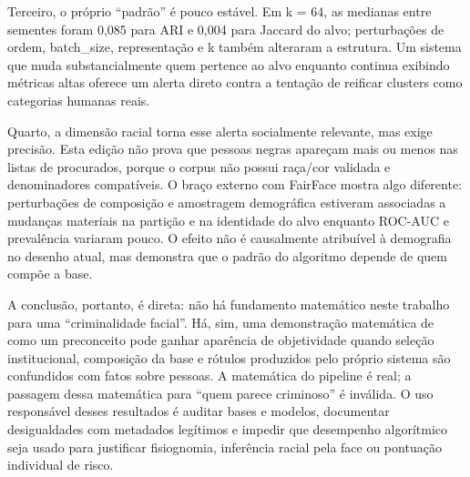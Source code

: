 Terceiro, o próprio ``padrão'' é pouco estável. Em k = 64, as medianas entre sementes foram 0,085 para ARI e 0,004 para Jaccard do alvo; perturbações de ordem, batch\_size, representação e k também alteraram a estrutura. Um sistema que muda substancialmente quem pertence ao alvo enquanto continua exibindo métricas altas oferece um alerta direto contra a tentação de reificar clusters como categorias humanas reais.

Quarto, a dimensão racial torna esse alerta socialmente relevante, mas exige precisão. Esta edição não prova que pessoas negras apareçam mais ou menos nas listas de procurados, porque o corpus não possui raça/cor validada e denominadores compatíveis. O braço externo com FairFace mostra algo diferente: perturbações de composição e amostragem demográfica estiveram associadas a mudanças materiais na partição e na identidade do alvo enquanto ROC-AUC e prevalência variaram pouco. O efeito não é causalmente atribuível à demografia no desenho atual, mas demonstra que o padrão do algoritmo depende de quem compõe a base.

A conclusão, portanto, é direta: não há fundamento matemático neste trabalho para uma ``criminalidade facial''. Há, sim, uma demonstração matemática de como um preconceito pode ganhar aparência de objetividade quando seleção institucional, composição da base e rótulos produzidos pelo próprio sistema são confundidos com fatos sobre pessoas. A matemática do pipeline é real; a passagem dessa matemática para ``quem parece criminoso'' é inválida. O uso responsável desses resultados é auditar bases e modelos, documentar desigualdades com metadados legítimos e impedir que desempenho algorítmico seja usado para justificar fisiognomia, inferência racial pela face ou pontuação individual de risco.

